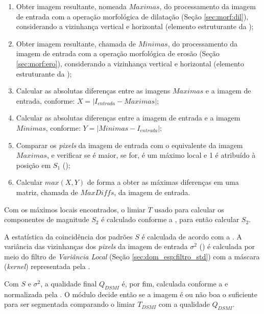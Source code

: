 \begin{enumerate}
    \item Obter imagem resultante, nomeada $Maximas$, do processamento da imagem de entrada com a operação morfológica de dilatação (Seção \ref{sec:morf:dil}), considerando a vizinhança vertical e horizontal (elemento estruturante da );
    \item Obter imagem resultante, chamada de $Minimas$, do processamento da imagem de entrada com a operação morfológica de erosão (Seção \ref{sec:morf:ero}), considerando a vizinhança vertical e horizontal (elemento estruturante da );
    \item Calcular as absolutas diferenças entre as imagens $Maximas$ e a imagem de entrada, conforme: $X = |I_{entrada} - Maximas|$;
    \item Calcular as absolutas diferenças entre a imagem de entrada e a imagem $Minimas$, conforme: $Y = |Minimas - I_{entrada}|$;
    \item Comparar os \textit{pixels} da imagem de entrada com o equivalente da imagem $Maximas$, e verificar se é maior, se for, é um máximo local e 1 é atribuído à posição em $S_{1}$ ();
    \item Calcular $max(X, Y)$ de forma a obter as máximas diferenças em uma matriz, chamada de $MaxDiffs$, da imagem de entrada.
\end{enumerate}

\par Com os máximos locais encontrados, o limiar $T$ usado para calcular os componentes de magnitude $S_{2}$ é calculado conforme a , para então calcular $S_{2}$. 

\par A estatística da coincidência dos padrões $S$ é calculada de acordo com a . A variância das vizinhanças dos \textit{pixels} da imagem de entrada $\sigma^2$ () é calculada por meio do filtro de \textit{Variância Local} (Seção \ref{sec:dom_esp:filtro_std}) com a máscara (\textit{kernel}) representada pela .

\par Com $S$ e $\sigma^2$, a qualidade final $Q_{DSMI}$ é, por fim, calculada conforme a  e normalizada pela . O módulo decide então se a imagem é ou não boa o suficiente para ser segmentada comparando o limiar $T_{DSMI}$ com a qualidade $Q_{DSMI}$.

